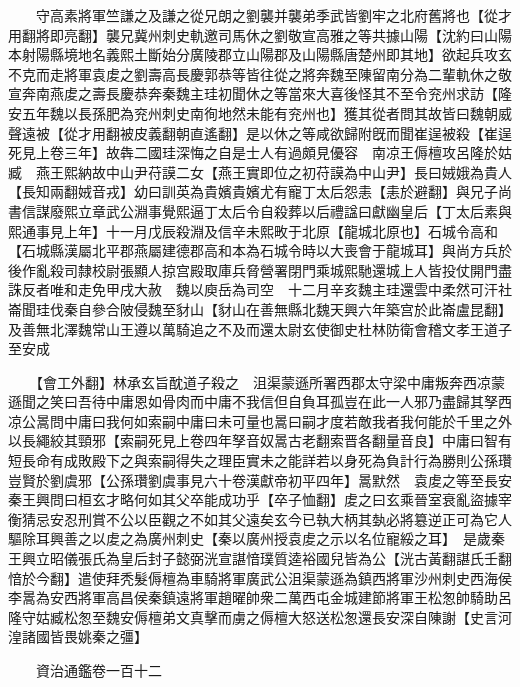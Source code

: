 　　守高素將軍竺謙之及謙之從兄朗之劉襲并襲弟季武皆劉牢之北府舊將也【從才用翻將即亮翻】襲兄冀州刺史軌邀司馬休之劉敬宣高雅之等共據山陽【沈約曰山陽本射陽縣境地名義熙土斷始分廣陵郡立山陽郡及山陽縣唐楚州即其地】欲起兵攻玄不克而走將軍袁䖍之劉壽高長慶郭恭等皆往從之將奔魏至陳留南分為二輩軌休之敬宣奔南燕䖍之壽長慶恭奔秦魏主珪初聞休之等當來大喜後怪其不至令兖州求訪【隆安五年魏以長孫肥為兖州刺史南徇地然未能有兖州也】獲其從者問其故皆曰魏朝威聲遠被【從才用翻被皮義翻朝直遙翻】是以休之等咸欲歸附旣而聞崔逞被殺【崔逞死見上卷三年】故犇二國珪深悔之自是士人有過頗見優容　南凉王傉檀攻呂隆於姑臧　燕王熙納故中山尹苻謨二女【燕王實即位之初苻謨為中山尹】長曰娀娥為貴人【長知兩翻娀音戎】幼曰訓英為貴嬪貴嬪尤有寵丁太后怨恚【恚於避翻】與兄子尚書信謀廢熙立章武公淵事覺熙逼丁太后令自殺葬以后禮諡曰獻幽皇后【丁太后素與熙通事見上年】十一月戊辰殺淵及信辛未熙畋于北原【龍城北原也】石城令高和【石城縣漢屬北平郡燕屬建德郡高和本為石城令時以大喪會于龍城耳】與尚方兵於後作亂殺司隸校尉張顯人掠宫殿取庫兵脅營署閉門乘城熙馳還城上人皆投仗開門盡誅反者唯和走免甲戌大赦　魏以庾岳為司空　十二月辛亥魏主珪還雲中柔然可汗社崙聞珪伐秦自參合陂侵魏至豺山【豺山在善無縣北魏天興六年築宫於此崙盧昆翻】及善無北澤魏常山王遵以萬騎追之不及而還太尉玄使御史杜林防衛會稽文孝王道子至安成

　　【會工外翻】林承玄旨酖道子殺之　沮渠蒙遜所署西郡太守梁中庸叛奔西凉蒙遜聞之笑曰吾待中庸恩如骨肉而中庸不我信但自負耳孤豈在此一人邪乃盡歸其孥西凉公暠問中庸曰我何如索嗣中庸曰未可量也暠曰嗣才度若敵我者我何能於千里之外以長繩絞其頸邪【索嗣死見上卷四年孥音奴暠古老翻索晋各翻量音良】中庸曰智有短長命有成敗殿下之與索嗣得失之理臣實未之能詳若以身死為負計行為勝則公孫瓚豈賢於劉虞邪【公孫瓚劉虞事見六十卷漢獻帝初平四年】暠默然　袁䖍之等至長安秦王興問曰桓玄才略何如其父卒能成功乎【卒子恤翻】䖍之曰玄乘晉室衰亂盜據宰衡猜忌安忍刑賞不公以臣觀之不如其父遠矣玄今已執大柄其埶必將簒逆正可為它人驅除耳興善之以䖍之為廣州刺史【秦以廣州授袁䖍之示以名位寵綏之耳】　是歲秦王興立昭儀張氏為皇后封子懿弼洸宣諶愔璞質逵裕國兒皆為公【洸古黃翻諶氏壬翻愔於今翻】遣使拜秃髮傉檀為車騎將軍廣武公沮渠蒙遜為鎮西將軍沙州刺史西海侯李暠為安西將軍高昌侯秦鎮遠將軍趙曜帥衆二萬西屯金城建節將軍王松怱帥騎助呂隆守姑臧松怱至魏安傉檀弟文真擊而虜之傉檀大怒送松怱還長安深自陳謝【史言河湟諸國皆畏姚秦之彊】

　　資治通鑑卷一百十二


    


 


 



 

